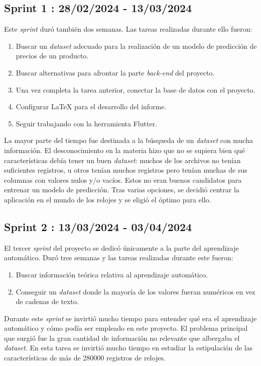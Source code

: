 \subsection{Sprint 1 : 28/02/2024 - 13/03/2024}

	Este \emph{sprint} duró también dos semanas. Las tareas realizadas durante ello fueron:
	\begin{enumerate}
		\item Buscar un \emph{dataset} adecuado para la realización de un modelo de predicción de precios de un producto.
		\item Buscar alternativas para afrontar la parte \emph{back-end} del proyecto.
		\item Una vez completa la tarea anterior, conectar la base de datos con el proyecto.
		\item Configurar LaTeX para el desarrollo del informe.
		\item Seguir trabajando con la herramienta Flutter.
	\end{enumerate}
	La mayor parte del tiempo fue destinada a la búsqueda de un \emph{dataset} con mucha información. El desconocimiento en la materia hizo que no se supiera bien qué características debía tener un buen \emph{dataset}: muchos de los archivos no tenían suficientes registros, u otros tenían muchos registros pero tenían muchas de sus columnas con valores nulos y/o vacíos. Estos no eran buenos candidatos para entrenar un modelo de predicción. Tras varias opciones, se decidió centrar la aplicación en el mundo de los relojes y se eligió el óptimo para ello.
	
\subsection{Sprint 2 : 13/03/2024 - 03/04/2024}

	El tercer \emph{sprint} del proyecto se dedicó únicamente a la parte del aprendizaje automático. Duró tres semanas y las tareas realizadas durante este fueron:
	\begin{enumerate}
		\item Buscar información teórica relativa al aprendizaje automático.
		\item Conseguir un \emph{dataset} donde la mayoría de los valores fueran numéricos en vez de cadenas de texto.
	\end{enumerate}
	Durante este \emph{sprint} se invirtió mucho tiempo para entender qué era el aprendizaje automático y cómo podía ser empleado en este proyecto. El problema principal que surgió fue la gran cantidad de información no relevante que albergaba el \emph{dataset}. En esta tarea se invirtió mucho tiempo en estudiar la estipulación de las características de más de 280000 registros de relojes.

